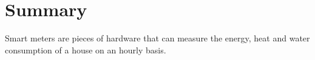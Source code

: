 \chapter{Summary}
Smart meters are pieces of hardware that can measure the energy, heat and water consumption of a house on an hourly basis. 